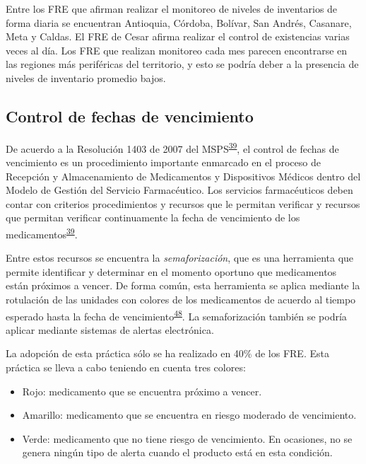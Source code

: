 \documentclass[
]{book}
\begin{document}
Entre los FRE que afirman realizar el monitoreo de niveles de inventarios de forma diaria se encuentran Antioquia, Córdoba, Bolívar, San Andrés, Casanare, Meta y Caldas. El FRE de Cesar afirma realizar el control de existencias varias veces al día. Los FRE que realizan monitoreo cada mes parecen encontrarse en las regiones más periféricas del territorio, y esto se podría deber a la presencia de niveles de inventario promedio bajos.

\hypertarget{control-de-fechas-de-vencimiento}{%
\subsection{Control de fechas de vencimiento}\label{control-de-fechas-de-vencimiento}}

De acuerdo a la Resolución 1403 de 2007 del MSPS\textsuperscript{\protect\hyperlink{ref-MinisteriodeSaludyProteccionSocial2007}{39}}, el control de fechas de vencimiento es un procedimiento importante enmarcado en el proceso de Recepción y Almacenamiento de Medicamentos y Dispositivos Médicos dentro del Modelo de Gestión del Servicio Farmacéutico. Los servicios farmacéuticos deben contar con criterios procedimientos y recursos que le permitan verificar y recursos que permitan verificar continuamente la fecha de vencimiento de los medicamentos\textsuperscript{\protect\hyperlink{ref-MinisteriodeSaludyProteccionSocial2007}{39}}.

Entre estos recursos se encuentra la \emph{semaforización}, que es una herramienta que permite identificar y determinar en el momento oportuno que medicamentos están próximos a vencer. De forma común, esta herramienta se aplica mediante la rotulación de las unidades con colores de los medicamentos de acuerdo al tiempo esperado hasta la fecha de vencimiento\textsuperscript{\protect\hyperlink{ref-HernandezVera2017}{48}}. La semaforización también se podría aplicar mediante sistemas de alertas electrónica.

La adopción de esta práctica sólo se ha realizado en 40\% de los FRE. Esta práctica se lleva a cabo teniendo en cuenta tres colores:

\begin{itemize}
\item
  Rojo: medicamento que se encuentra próximo a vencer.
\item
  Amarillo: medicamento que se encuentra en riesgo moderado de vencimiento.
\item
  Verde: medicamento que no tiene riesgo de vencimiento. En ocasiones, no se genera ningún tipo de alerta cuando el producto está en esta condición.
\end{itemize}
\end{document}
